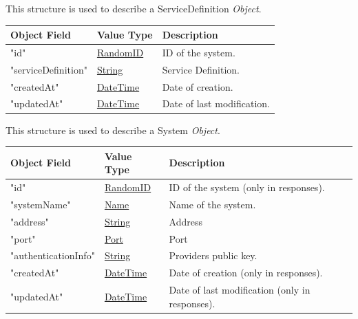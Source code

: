 \documentclass[a4paper]{arrowhead}
\newcommand{\pref}[1]{{\textcolor{ArrowheadGrey}{\hyperref[sec:model:primitives:#1]{#1}}}}
\begin{document}

This structure is used to describe a ServiceDefinition \textit{Object}.

\begin{table}[ht!]
\begin{tabularx}{\textwidth}{| p{5cm} | p{3.5cm} | X |} \hline
\rowcolor{gray!33} Object Field & Value Type      & Description \\ \hline
"id"                  & \pref{RandomID}   & ID of the system. \\ \hline
"serviceDefinition"          & \pref{String}       & Service Definition. \\ \hline
"createdAt"           & \pref{DateTime}   & Date of creation. \\ \hline
"updatedAt"           & \pref{DateTime}   & Date of last modification. \\ \hline


\end{tabularx}
\end{table}


This structure is used to describe a System \textit{Object}.

\begin{table}[ht!]
\begin{tabularx}{\textwidth}{| p{5cm} | p{3.5cm} | X |} \hline
\rowcolor{gray!33} Object Field & Value Type      & Description \\ \hline
"id"                  & \pref{RandomID}   & ID of the system (only in responses). \\ \hline
"systemName"          & \pref{Name}       & Name of the system. \\ \hline
"address"             & \pref{String}     & Address \\ \hline
"port"                & \pref{Port}       & Port \\ \hline
"authenticationInfo"  & \pref{String}     & Providers public key. \\ \hline
"createdAt"           & \pref{DateTime}   & Date of creation (only in responses). \\ \hline
"updatedAt"           & \pref{DateTime}   & Date of last modification (only in responses). \\ \hline


\end{tabularx}
\end{table}
\end{document}
